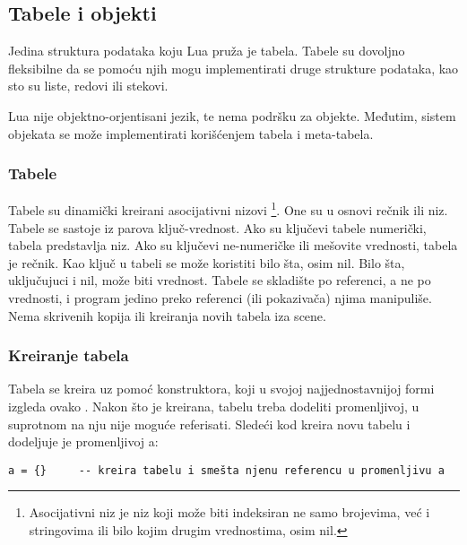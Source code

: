 \documentclass[a4paper]{article}
\begin{document}
\subsection*{Tabele i objekti}
Jedina struktura podataka koju Lua pruža je tabela. Tabele su dovoljno fleksibilne da se pomoću njih mogu implementirati druge strukture podataka, kao sto su liste, redovi ili stekovi.

Lua nije objektno-orjentisani jezik, te nema podršku za objekte. Međutim, sistem objekata se može implementirati korišćenjem tabela i meta-tabela.

\subsubsection*{Tabele}
Tabele su dinamički kreirani asocijativni nizovi \footnote{Asocijativni niz je niz koji može biti indeksiran ne samo brojevima, već i stringovima ili bilo kojim drugim vrednostima, osim nil.}. One su u osnovi rečnik ili niz. Tabele se sastoje iz parova ključ-vrednost. Ako su ključevi tabele numerički, tabela predstavlja niz. Ako su ključevi ne-numeričke ili mešovite vrednosti, tabela je rečnik. Kao ključ u tabeli se može koristiti bilo šta, osim nil. Bilo šta, uključujuci i nil, može biti vrednost.
Tabele se skladište po referenci, a ne po vrednosti, i program jedino preko referenci (ili pokazivača) njima manipuliše. Nema skrivenih kopija ili kreiranja novih tabela iza scene.

\subsubsection*{Kreiranje tabela}
Tabela se kreira uz pomoć konstruktora, koji u svojoj najjednostavnijoj formi izgleda ovako {}. Nakon što je kreirana, tabelu treba dodeliti promenljivoj, u suprotnom na nju nije moguće referisati. Sledeći kod kreira novu tabelu i dodeljuje je promenljivoj a:
\begin{verbatim}
a = {}     -- kreira tabelu i smešta njenu referencu u promenljivu a
\end{verbatim}
\end{document}
